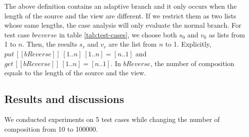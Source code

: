\documentclass[runningheads]{llncs}
\newcommand{\putbx}[3]{put \, [\![#1]\!] \ #2 \ #3}
\newcommand{\getbx}[2]{get \, [\![#1]\!] \ #2}
\begin{document}
The above definition contains an adaptive branch and it only occurs when the length of the source and the view are different. If we restrict them as two lists whose same lengths, the case analysis will only evaluate the normal branch. For test case $breverse$ in table \ref{tab:test-cases}, we choose both $s_0$ and $v_0$ as lists from 1 to $n$. Then, the results $s_r$ and $v_r$ are the list from $n$ to 1. Explicitly, $\putbx{bReverse}{[1..n]}{[1..n]} = [n..1]$ and $\getbx{bReverse}{[1..n]} = [n..1]$. In $bReverse$, the number of composition equals to the length of the source and the view.

\subsection{Results and discussions}
We conducted experiments on 5 test cases while changing the number of composition from 10 to 100000.
\end{document}
